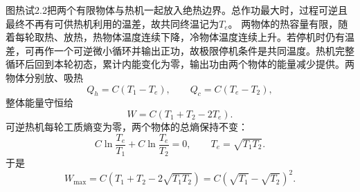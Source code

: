 \documentclass[UTF8,fontset=fandol,a4paper,11pt]{ctexart}
\begin{document}
图热试2.2把两个有限物体与热机一起放入绝热边界。总作功最大时，过程可逆且最终不再有可供热机利用的温差，故共同终温记为$T_e$。
两物体的热容量有限，随着每轮取热、放热，热物体温度连续下降，冷物体温度连续上升。若停机时仍有温差，可再作一个可逆微小循环并输出正功，故极限停机条件是共同温度。热机完整循环后回到本轮初态，累计内能变化为零，输出功由两个物体的能量减少提供。两物体分别放、吸热
\[
Q_h=C(T_1-T_e),\qquad Q_c=C(T_e-T_2),
\]
整体能量守恒给
\[
W=C(T_1+T_2-2T_e).
\]
可逆热机每轮工质熵变为零，两个物体的总熵保持不变：
\[
C\ln\frac{T_e}{T_1}+C\ln\frac{T_e}{T_2}=0,
\qquad
\boxed{T_e=\sqrt{T_1T_2}}.
\]
于是
\[
\boxed{W_{\max}=C(T_1+T_2-2\sqrt{T_1T_2})
=C(\sqrt{T_1}-\sqrt{T_2})^2}.
\]
\begin{center}\begin{minipage}{.98\linewidth}\centering
{}
\end{minipage}
\end{center}
\end{document}
